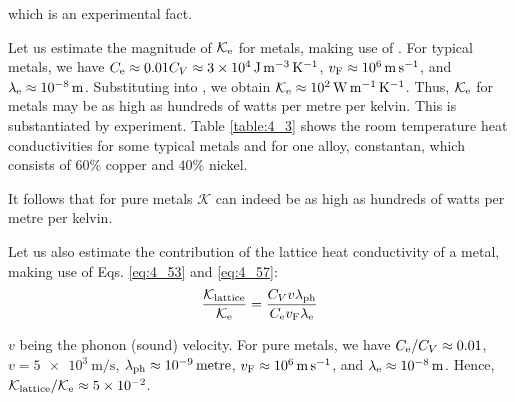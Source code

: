\noindent
which is an experimental fact.

Let us estimate the magnitude of $\mathcal{K}_{\text{e}}$ for metals, making use of . For typical metals, we have $C_{\text{e}}\approx 0.01C_V\approx\SI{3e4}{\joule\per\metre\cubed\per\kelvin}$,
$v_{\text{F}}\approx\SI{e6}{\metre\per\second}$, and $\lambda_{\text{e}}\approx\SI{e-8}{\metre}$. Substituting into , we obtain $\mathcal{K}_{\text{e}}\approx\SI{e2}{\watt\per\metre\per\kelvin}$.
Thus, $\mathcal{K}_{\text{e}}$ for metals may be as high as hundreds of watts per metre per kelvin. This is substantiated by experiment. Table \ref{table:4_3} shows the room temperature heat conductivities for some typical metals and for one alloy, constantan, which consists of $60\%$ copper and $40\%$ nickel.

\begin{table}[!b]
	\renewcommand{\arraystretch}{1.2}
	\caption{}
	\vspace{-0.6cm}
	\label{table:4_3}
	\begin{center}\end{center}
\end{table}

It follows that for pure metals $\mathcal{K}$ can indeed be as high as hundreds of watts per metre per kelvin.

Let us also estimate the contribution of the lattice heat conductivity of a metal, making use of Eqs. \eqref{eq:4_53} and \eqref{eq:4_57}:
\begin{equation*}
    \frac{\mathcal{K}_{\text{lattice}}}{\mathcal{K}_{\text{e}}} = \frac{C_V v \lambda_{\text{ph}}}{C_{\text{e}} v_{\text{F}} \lambda_{\text{e}}}
\end{equation*}

\noindent
$v$ being the phonon (sound) velocity. For pure metals, we have $C_{\text{e}}/C_V\approx 0.01$, $v=\SI{5e3}{\metre\per\second}$, $\lambda_{\text{ph}}\approx\SI{e-9}{metre}$, $v_{\text{F}}\approx\SI{e6}{\metre\per\second}$, and $\lambda_{\text{e}}\approx\SI{e-8}{\metre}$.
Hence, $\mathcal{K}_{\text{lattice}}/\mathcal{K}_{\text{e}}\approx\num{5e-2}$.

